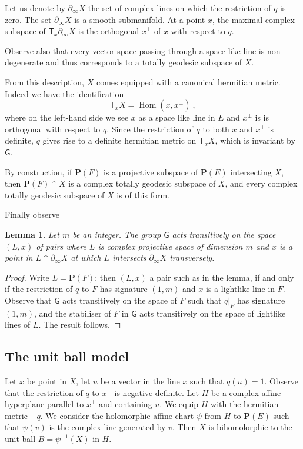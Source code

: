 \documentclass[12pt,reqno]{amsart}
\newtheorem{lemma}[theorem]{Lemma}
\newcommand{\mG}{\ms G}
\newcommand{\ms}{\mathsf}
\newcommand{\Hom}{\operatorname{Hom}}
\newcommand{\bP}{{\mathbf P}}
\begin{document}
Let us denote by $\partial_\infty X$ the set of complex lines on which the restriction of $q$ is zero. The set $\partial_\infty X$ is a smooth submanifold. At a point $x$, the maximal complex subspace of $\mathsf T_x\partial_\infty X$ is the orthogonal $x^\perp$ of $x$ with respect to $q$.

Observe also that every vector space passing through a space like line is non degenerate and thus corresponds to a totally geodesic subspace of $X$.

From this description, $X$ comes equipped with a canonical hermitian metric. Indeed we have the identification 
$$
\mathsf T_xX=\Hom(x, x^\perp)\ ,
$$ 
where on the left-hand side we see $x$ as a space like line in $E$ and $x^\perp$ is is orthogonal with respect to $q$. Since the restriction of $q$ to both  $x$ and $x^\perp$ is definite,  $q$ gives rise to  a definite hermitian  metric on $\mathsf T_xX$, which is invariant by $\mathsf G$.

By construction, if $\bP(F)$ is a projective subspace of $\bP(E)$ intersecting $X$, then $\bP(F)\cap X$ is a complex totally geodesic subspace of $X$, and every complex totally geodesic subspace of $X$ is of this form.

Finally observe

\begin{lemma}\label{lem:trans} Let $m$ be an integer.
The group $\mathsf G$ acts transitively on the space  $(L,x)$ of pairs where $L$ is complex projective space of dimension $m$  and $x$ is a point in $L\cap\partial_\infty X$ at which $L$ intersects $\partial_\infty X$ transversely.
\end{lemma}
\begin{proof}
	 Write $L=\bP(F)$; then $(L,x)$  a pair such as in the lemma, if and only if the restriction of $q$ to $F$ has signature $(1,m)$ and $x$ is a lightlike line in $F$. Observe that  $\mG$ acts transitively on the space of $F$ such that $q\vert_F$ has signature $(1,m)$, and the stabiliser of $F$ in $\mG$ acts transitively on the space of lightlike lines of $L$. The result follows.
\end{proof}
\subsection{The unit ball model}\label{sec:unitballmodel}
Let $x$ be point in $X$, let $u$  be a vector in the line  $x$ such that $q(u)=1$. Observe that the restriction of $q$ to $x^\perp$ is negative definite. Let $H$ be a complex  affine hyperplane parallel to $x^\perp$ and containing $u$. We equip $H$ with the hermitian metric $-q$. We  consider the holomorphic affine chart $\psi$ from $H$ to $\bP(E)$ such that $\psi(v)$ is the complex line generated by $v$. Then $X$ is bihomolorphic to the unit ball $B=\psi^{-1}(X)$ in $H$. 
\end{document}
